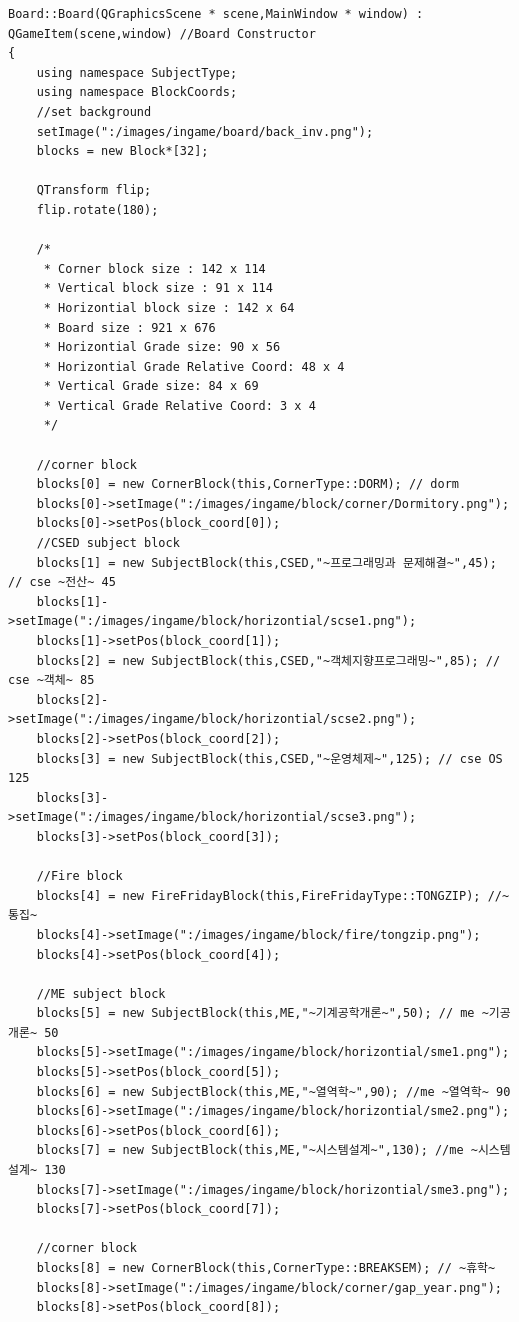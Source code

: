 \documentclass[10pt,oneside,a4paper,titlepage]{article}
\begin{document}
\begin{lstlisting}[escapeinside=~~]
Board::Board(QGraphicsScene * scene,MainWindow * window) : QGameItem(scene,window) //Board Constructor
{
    using namespace SubjectType;
    using namespace BlockCoords;
    //set background
    setImage(":/images/ingame/board/back_inv.png");
    blocks = new Block*[32];

    QTransform flip;
    flip.rotate(180);

    /*
     * Corner block size : 142 x 114
     * Vertical block size : 91 x 114
     * Horizontial block size : 142 x 64
     * Board size : 921 x 676
     * Horizontial Grade size: 90 x 56
     * Horizontial Grade Relative Coord: 48 x 4
     * Vertical Grade size: 84 x 69
     * Vertical Grade Relative Coord: 3 x 4
     */

    //corner block
    blocks[0] = new CornerBlock(this,CornerType::DORM); // dorm
    blocks[0]->setImage(":/images/ingame/block/corner/Dormitory.png");
    blocks[0]->setPos(block_coord[0]);
    //CSED subject block
    blocks[1] = new SubjectBlock(this,CSED,"~프로그래밍과 문제해결~",45); // cse ~전산~ 45
    blocks[1]->setImage(":/images/ingame/block/horizontial/scse1.png");
    blocks[1]->setPos(block_coord[1]);
    blocks[2] = new SubjectBlock(this,CSED,"~객체지향프로그래밍~",85); // cse ~객체~ 85
    blocks[2]->setImage(":/images/ingame/block/horizontial/scse2.png");
    blocks[2]->setPos(block_coord[2]);
    blocks[3] = new SubjectBlock(this,CSED,"~운영체제~",125); // cse OS 125
    blocks[3]->setImage(":/images/ingame/block/horizontial/scse3.png");
    blocks[3]->setPos(block_coord[3]);

    //Fire block
    blocks[4] = new FireFridayBlock(this,FireFridayType::TONGZIP); //~통집~
    blocks[4]->setImage(":/images/ingame/block/fire/tongzip.png");
    blocks[4]->setPos(block_coord[4]);

    //ME subject block
    blocks[5] = new SubjectBlock(this,ME,"~기계공학개론~",50); // me ~기공개론~ 50
    blocks[5]->setImage(":/images/ingame/block/horizontial/sme1.png");
    blocks[5]->setPos(block_coord[5]);
    blocks[6] = new SubjectBlock(this,ME,"~열역학~",90); //me ~열역학~ 90
    blocks[6]->setImage(":/images/ingame/block/horizontial/sme2.png");
    blocks[6]->setPos(block_coord[6]);
    blocks[7] = new SubjectBlock(this,ME,"~시스템설계~",130); //me ~시스템설계~ 130
    blocks[7]->setImage(":/images/ingame/block/horizontial/sme3.png");
    blocks[7]->setPos(block_coord[7]);

    //corner block
    blocks[8] = new CornerBlock(this,CornerType::BREAKSEM); // ~휴학~
    blocks[8]->setImage(":/images/ingame/block/corner/gap_year.png");
    blocks[8]->setPos(block_coord[8]);



\end{lstlisting}
\end{document}
